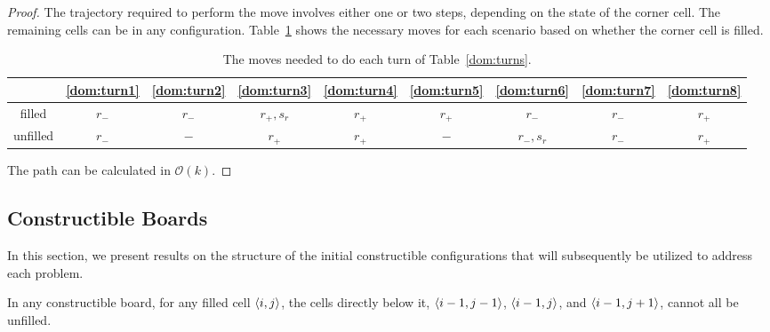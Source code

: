 \begin{proof}
The trajectory required to perform the move involves either one or two steps, depending on the state of the corner cell. The remaining cells can be in any configuration. Table~\ref{dom:turns-table} shows the necessary moves for each scenario based on whether the corner cell is filled.

\begin{table}[ht]
\centering
\begin{tabular}{|c || c | c | c | c | c | c | c | c |} 
 \hline
  & \ref{dom:turn1} & \ref{dom:turn2} & \ref{dom:turn3} & \ref{dom:turn4} & \ref{dom:turn5} & \ref{dom:turn6} & \ref{dom:turn7} & \ref{dom:turn8} \\
 \hline               
  filled & $ r_-  $ & $      r_-    $ & $   r_+, s_r  $ & $   r_+       $ & $   r_+       $ & $     r_-     $ & $   r_-       $ & $   r_+      $  \\
 \hline               
unfilled & $ r_-  $ & $     -       $ & $   r_+       $ & $   r_+       $ & $    -        $ & $  r_-, s_r   $ & $   r_-       $ & $   r_+      $  \\
 \hline               

\end{tabular}
\caption{The moves needed to do each turn of Table~\ref{dom:turns}.}
\label{dom:turns-table}
\end{table}

The path can be calculated in $\mathcal{O}(k)$.

\end{proof}


\subsection{Constructible Boards}

In this section, we present results on the structure of the initial constructible configurations that will subsequently be utilized to address each problem.

\begin{lemma0} \label{lem:floating}
  In any constructible board, for any filled cell $\cell$, the cells directly below it, $\cell[i-1][j-1]$, $\cell[i-1][j]$, and $\cell[i-1][j+1]$, cannot all be unfilled.
\end{lemma0}  

